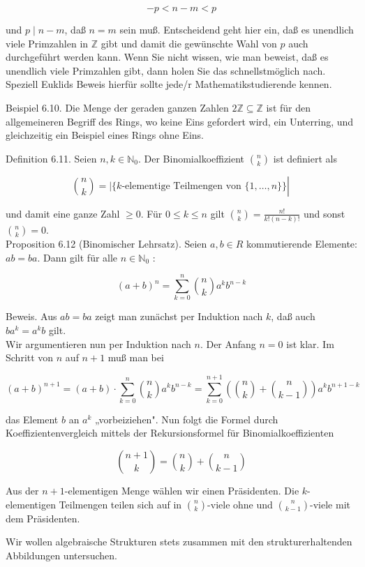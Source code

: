 \documentclass[10pt, letterpaper]{article}
\begin{document}
$$
-p<n-m<p
$$

und $p \mid n-m$, daß $n=m$ sein muß. Entscheidend geht hier ein, daß es unendlich viele Primzahlen in $\mathbb{Z}$ gibt und damit die gewünschte Wahl von $p$ auch durchgeführt werden kann. Wenn Sie nicht wissen, wie man beweist, daß es unendlich viele Primzahlen gibt, dann holen Sie das schnellstmöglich nach. Speziell Euklids Beweis hierfür sollte jede/r Mathematikstudierende kennen.

Beispiel 6.10. Die Menge der geraden ganzen Zahlen $2 \mathbb{Z} \subseteq \mathbb{Z}$ ist für den allgemeineren Begriff des Rings, wo keine Eins gefordert wird, ein Unterring, und gleichzeitig ein Beispiel eines Rings ohne Eins.

Definition 6.11. Seien $n, k \in \mathbb{N}_{0}$. Der Binomialkoeffizient $\binom{n}{k}$ ist definiert als

$$
\left.\binom{n}{k}=\mid\{k \text {-elementige Teilmengen von }\{1, \ldots, n\}\} \right\rvert\,
$$

und damit eine ganze Zahl $\geq 0$. Für $0 \leq k \leq n$ gilt $\binom{n}{k}=\frac{n!}{k!(n-k)!}$ und sonst $\binom{n}{k}=0$.\\
Proposition 6.12 (Binomischer Lehrsatz). Seien $a, b \in R$ kommutierende Elemente: $a b=b a$. Dann gilt für alle $n \in \mathbb{N}_{0}$ :

$$
(a+b)^{n}=\sum_{k=0}^{n}\binom{n}{k} a^{k} b^{n-k}
$$

Beweis. Aus $a b=b a$ zeigt man zunächst per Induktion nach $k$, daß auch $b a^{k}=a^{k} b$ gilt.\\
Wir argumentieren nun per Induktion nach $n$. Der Anfang $n=0$ ist klar. Im Schritt von $n$ auf $n+1$ muß man bei

$$
(a+b)^{n+1}=(a+b) \cdot \sum_{k=0}^{n}\binom{n}{k} a^{k} b^{n-k}=\sum_{k=0}^{n+1}\left(\binom{n}{k}+\binom{n}{k-1}\right) a^{k} b^{n+1-k}
$$

das Element $b$ an $a^{k}$ „vorbeiziehen". Nun folgt die Formel durch Koeffizientenvergleich mittels der Rekursionsformel für Binomialkoeffizienten

$$
\binom{n+1}{k}=\binom{n}{k}+\binom{n}{k-1}
$$

Aus der $n+1$-elementigen Menge wählen wir einen Präsidenten. Die $k$-elementigen Teilmengen teilen sich auf in $\binom{n}{k}$-viele ohne und $\binom{n}{k-1}$-viele mit dem Präsidenten.

Wir wollen algebraische Strukturen stets zusammen mit den strukturerhaltenden Abbildungen untersuchen.
\end{document}
